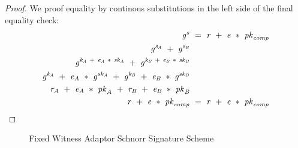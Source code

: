 \begin{proof} \label{prf:twoparty-schnorr}
    We proof equality by continous substitutions in the left side of the final equality check:
    \begin{align}
        \mathit{g}^{\mathit{s}} &~=~ \mathit{r} ~+~ \mathit{e} ~*~ \mathit{pk}_{\mathit{comp}} \\
        \mathit{g}^{\mathit{s}_{\mathit{A}}} ~+~ \mathit{g}^{\mathit{s}_{\mathit{B}}} & \\
        \mathit{g}^{\mathit{\mathit{k}_{\mathit{A}}} ~+~ \mathit{e}_{\mathit{A}} ~*~ \mathit{sk}_{\mathit{A}}} ~+~ \mathit{g}^{\mathit{\mathit{k}_{\mathit{B}}} ~+~ \mathit{e}_{\mathit{B}} ~*~ \mathit{sk}_{\mathit{B}}} & \\
        \mathit{g}^{\mathit{\mathit{k}_{\mathit{A}}}} ~+~ \mathit{e}_{\mathit{A}} ~*~ \mathit{g}^{\mathit{sk}_{\mathit{A}}} ~+~ \mathit{g}^{\mathit{\mathit{k}_{\mathit{B}}}} ~+~ \mathit{e}_{\mathit{B}} ~*~ \mathit{g}^{\mathit{sk}_{\mathit{B}}} & \\
        \mathit{r}_{\mathit{A}} ~+~ \mathit{e}_{\mathit{A}} ~*~ \mathit{pk}_{\mathit{A}} ~+~ \mathit{r}_{\mathit{B}} ~+~ \mathit{e}_{\mathit{B}} ~*~ \mathit{pk}_{\mathit{B}} & \\
        \mathit{r} ~+~ \mathit{e} ~*~ \mathit{pk}_{\mathit{comp}} & ~=~ \mathit{r} ~+~ \mathit{e} ~*~ \mathit{pk}_{\mathit{comp}}
    \end{align}
\end{proof}

\begin{figure}
    \label{fig:apt-schnorr}
    \fbox{
        \parbox{\textwidth} {
            \procedure[linenumbering, syntaxhighlight=auto]{$\procAptSig{\varSigAlice}{\varWit}$} {
                \varSigAptAlice \opAssign \varSigAlice \opAdd \varWit \\
                \pcreturn \varSigAptAlice \opAssign (\varSigPartApt \opSeperate \funGen{\varWit})
            }
            \procedure[linenumbering, syntaxhighlight=auto]{$\procVrfApt{\varMsg}{\varSecKeyAlice}{\varNonceAlice}{\varPubKeyBob}{\varRandBob}{\funGen{\varWit}}{\varSigAptBob}$} {
                \varSchnorrChallenge \opAssign \funHash{\varMsg \opConc \varPubKeyAlice \opAdd \varPubKeyBob \opConc \varRandAlice \opAdd \varRandBob} \\
                \pcreturn \varSigAptBob \opEq \varPubKeyBob \opAdd \varSchnorrChallenge \opMult \funGen{\varRandBob} \opAdd \funGen{\varWit}
            } \\
            \procedure[linenumbering, syntaxhighlight=auto]{$\procExtWit{\varSigFin}{\varSigAlice}{\varSigAptBob}$}{
                \varSigBob \opAssign \varSigFin \opSub \varSigAlice \\
                \varWit \opAssign \varSigAptBob \opSub \varSigBob \\
                \pcreturn (\varWit)
            }
        }
    }
    \caption{Fixed Witness Adaptor Schnorr Signature Scheme}
\end{figure}